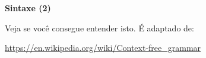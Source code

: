\documentclass[oneside,12pt]{article}
\begin{document}
\newpage


{\bf Sintaxe (2)}

{\footnotesize

Veja se você consegue entender isto. É adaptado de:

\url{https://en.wikipedia.org/wiki/Context-free_grammar}

}

\bsk
\bsk

\def\NT<#1>{〈\textsf{#1}〉}
\def\T#1{\ColorRed{\tt#1}}
\def\T#1{\mathstrut \ColorRed{\tt#1}}
\def\und#1#2{\underbrace{#1}_{\textstyle#2}}

\def\BurUnd{
\und{\T{if}
     \;\;
     \T{(}
     \und{\und{\und{\T{x}
                    }{\NT<Id>}
               }{\NT<Expr>}
          \und{\T{>}
               }{\NT<Optr>}
          \und{\und{\T{9}
                    }{\NT<Num>}
               }{\NT<Expr>}
          }{\NT<Expr>}
     \T{)}
     \;
     \und{\und{\T{\{}
               \und{\und{\und{\T{x}
                              }{\NT<Id>}
                         \T{=}
                         \und{\und{\T{0}
                                   }{\NT<Num>}
                              }{\NT<Expr>}
                         \T{;}
                         }{\NT<Stmt>}
                    }{\NT<StmtList>}
               \und{\und{\T{y}
                         }{\NT<Id>}
                    \T{=}
                    \und{\und{\T{y}
                              }{\NT<Expr>}
                         \und{\T{+}
                              }{\NT<Optr>}
                         \und{\T{1}
                              }{\NT<Expr>}
                         }{\NT<Expr>}
                    \T{;}
                    }{\NT<Stmt>}
               \;
               \T{\}}
               }{\NT<StmtList>}
          }{\NT<Stmt>}
     }{\NT<Stmt>}
}

\vspace*{-0.25cm}
\end{document}
